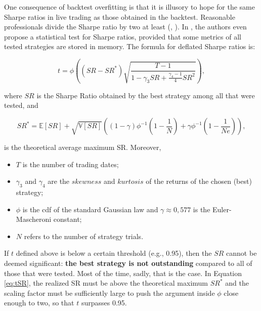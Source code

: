 One consequence of backtest overfitting is that it is illusory to hope for the same Sharpe ratios in live trading as those obtained in the backtest. Reasonable professionals divide the Sharpe ratio by two at least (\cite{harvey2015backtesting}, \cite{suhonen2017quantifying}). In \cite{bailey2014deflated}, the authors even propose a statistical test for Sharpe ratios, provided that some metrics of all tested strategies are stored in memory. The formula for deflated Sharpe ratios is:

\begin{equation}
\label{eq:tSR}
t = \phi\left((SR-SR^*)\sqrt{\frac{T-1}{1-\gamma_3SR+\frac{\gamma_4-1}{4}SR^2}} \right),
\end{equation}

where $SR$ is the Sharpe Ratio obtained by the best strategy among all that were tested, and

\begin{equation}
SR^*=\mathbb{E}[SR]+\sqrt{\mathbb{V}[SR]}\left((1-\gamma)\phi^{-1}\left(1-\frac{1}{N}\right)+\gamma \phi^{-1}\left(1-\frac{1}{Ne}\right)  \right),
\end{equation}

is the theoretical average maximum SR. Moreover,

\begin{itemize}
\item $T$ is the number of trading dates;
\item $\gamma_3$ and $\gamma_4$ are the $skewness$ and $kurtosis$ of the returns of the chosen (best) strategy;
\item $\phi$ is the cdf of the standard Gaussian law and $\gamma\approx 0,577$ is the Euler-Mascheroni constant;
\item $N$ refers to the number of strategy trials.
\end{itemize}

If $t$ defined above is below a certain threshold (e.g., 0.95), then the $SR$ cannot be deemed significant: \textbf{the best strategy is not outstanding} compared to all of those that were tested. Most of the time, sadly, that is the case. In Equation \ref{eq:tSR}, the realized SR must be above the theoretical maximum $SR^*$ and the scaling factor must be sufficiently large to push the argument inside $\phi$ close enough to two, so that $t$ surpasses 0.95.

